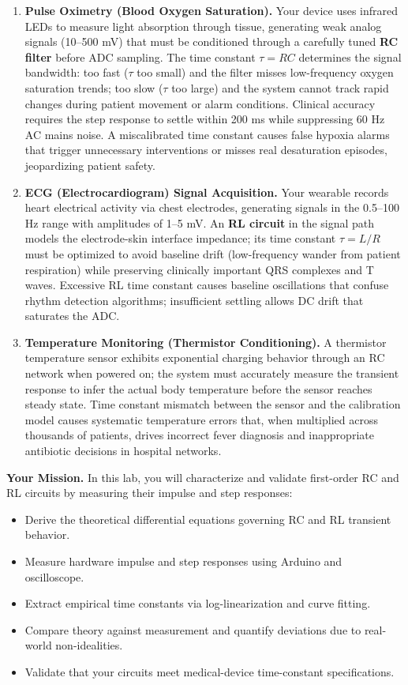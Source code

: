 \documentclass[11pt,letterpaper]{article}
\begin{document}
\begin{enumerate}[leftmargin=0.4in]
    \item \textbf{Pulse Oximetry (Blood Oxygen Saturation).} Your device uses infrared LEDs to measure light absorption through tissue, generating weak analog signals (10--500 mV) that must be conditioned through a carefully tuned \textbf{RC filter} before ADC sampling. The time constant $\tau = RC$ determines the signal bandwidth: too fast ($\tau$ too small) and the filter misses low-frequency oxygen saturation trends; too slow ($\tau$ too large) and the system cannot track rapid changes during patient movement or alarm conditions. Clinical accuracy requires the step response to settle within 200 ms while suppressing 60 Hz AC mains noise. A miscalibrated time constant causes false hypoxia alarms that trigger unnecessary interventions or misses real desaturation episodes, jeopardizing patient safety.

    \item \textbf{ECG (Electrocardiogram) Signal Acquisition.} Your wearable records heart electrical activity via chest electrodes, generating signals in the 0.5--100 Hz range with amplitudes of 1--5 mV. An \textbf{RL circuit} in the signal path models the electrode-skin interface impedance; its time constant $\tau = L/R$ must be optimized to avoid baseline drift (low-frequency wander from patient respiration) while preserving clinically important QRS complexes and T waves. Excessive RL time constant causes baseline oscillations that confuse rhythm detection algorithms; insufficient settling allows DC drift that saturates the ADC.

    \item \textbf{Temperature Monitoring (Thermistor Conditioning).} A thermistor temperature sensor exhibits exponential charging behavior through an RC network when powered on; the system must accurately measure the transient response to infer the actual body temperature before the sensor reaches steady state. Time constant mismatch between the sensor and the calibration model causes systematic temperature errors that, when multiplied across thousands of patients, drives incorrect fever diagnosis and inappropriate antibiotic decisions in hospital networks.
\end{enumerate}

\noindent
\textbf{Your Mission.} In this lab, you will characterize and validate first-order RC and RL circuits by measuring their impulse and step responses:
\begin{itemize}
    \item Derive the theoretical differential equations governing RC and RL transient behavior.
    \item Measure hardware impulse and step responses using Arduino and oscilloscope.
    \item Extract empirical time constants via log-linearization and curve fitting.
    \item Compare theory against measurement and quantify deviations due to real-world non-idealities.
    \item Validate that your circuits meet medical-device time-constant specifications.
\end{itemize}
\end{document}
